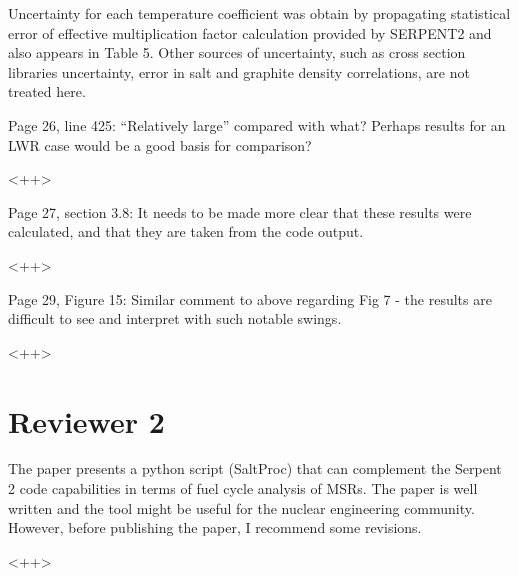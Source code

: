 \documentclass[answers,11pt]{exam}
\begin{document}
\begin{questions}
\begin{solution}
                 Uncertainty for each temperature coefficient was obtain by 
                 propagating statistical error of effective multiplication factor 
                 calculation provided by SERPENT2 and also appears in Table 5. 
                 Other sources of uncertainty, such as cross section libraries 
				 uncertainty, error in salt and graphite density correlations, 
				 are not treated here.
        \end{solution}

        \question  Page 26, line 425: ``Relatively large'' compared with what? 
        Perhaps results for an LWR case would be a good basis for comparison?
        \begin{solution}
                <++>
        \end{solution}

        \question  Page 27, section 3.8: It needs to be made more clear that 
        these results were calculated, and that they are taken from the code 
        output.
        \begin{solution}
                <++>
        \end{solution}

        \question  Page 29, Figure 15: Similar comment to above regarding Fig 7 
        - the results are difficult to see and interpret with such notable 
        swings.
        \begin{solution}
                <++>
        \end{solution}





        \section*{Reviewer 2}

        \question The paper presents a python script (SaltProc) that can 
        complement the Serpent 2 code capabilities in terms of fuel cycle 
        analysis of MSRs. The paper is well written and the tool might be 
        useful for the nuclear engineering community. However, before 
        publishing the paper, I recommend some revisions.
        \begin{solution}
                <++>
        \end{solution}


\end{questions}
\end{document}
